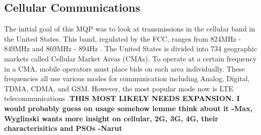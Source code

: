 \subsection{Cellular Communications}
The initial goal of this MQP was to look at transmissions in the cellular band in the United States. This band, regulated by the FCC, ranges from 824MHz - 849MHz and 869MHz - 894Hz \cite{cellular_coms}. The United States is divided into 734 geographic markets called Cellular Market Areas (CMAs). To operate at a certain frequency in a CMA, mobile operators must place bids on each area individually. These frequencies all use various modes for communication including Analog, Digital, TDMA, CDMA, and GSM. However, the most popular mode now is LTE telecommunications \cite{cellular_book}.\textbf{THIS MOST LIKELY NEEDS EXPANSION. I would probably guess on usage somehow lemme think about it -Max, Wyglinski wants more insight on cellular, 2G, 3G, 4G, their characterisitics and PSOs -Narut}

